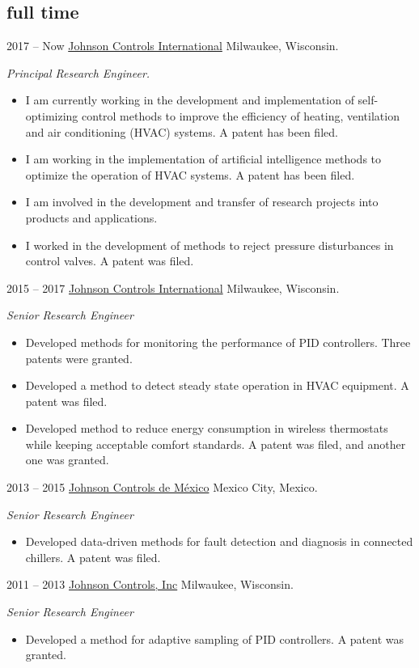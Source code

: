 \documentclass[]{../friggeri-cv} %
\begin{document}
\subsection{full time}

\begin{entrylist}


\entry
{2017 -- Now}
{\href{http://www.johnsoncontrols.com}{Johnson Controls International}}
{Milwaukee, Wisconsin.}
{
\emph{Principal Research Engineer.}
\begin{itemize}
	\item I am currently working in the development and implementation of self-optimizing control methods to improve the efficiency of heating, ventilation and air conditioning (HVAC) systems. A patent has been filed.
	\item I am working in the implementation of artificial intelligence methods to optimize the operation of HVAC systems. A patent has been filed.
	\item I am involved in the development and transfer of research projects into products and applications.
   \item I worked in the development of methods to reject pressure disturbances in control valves. A patent was filed.
   
\end{itemize}
}
\entry
{2015 -- 2017}
{\href{http://www.johnsoncontrols.com}{Johnson Controls International}}
{Milwaukee, Wisconsin.}
{
\emph{Senior Research Engineer}
\begin{itemize}
\item Developed methods for monitoring the performance of PID controllers. Three patents were granted.
\item Developed a method to detect steady state operation in HVAC equipment. A patent was filed.
\item Developed method to reduce energy consumption in wireless thermostats while keeping acceptable comfort standards. A patent was filed, and another one was granted.
\end{itemize}
}

\entry
{2013 -- 2015}
{\href{http://www.johnsoncontrols.com/es_mx}{Johnson Controls de México}}
{Mexico City, Mexico.}
{
\emph{Senior Research Engineer}
\begin{itemize}
\item Developed data-driven methods for fault detection and diagnosis in connected chillers. A patent was filed.
\end{itemize}
}

\entry
{2011 -- 2013}
{\href{http://www.johnsoncontrols.com}{Johnson Controls, Inc}}
{Milwaukee, Wisconsin.}
{
\emph{Senior Research Engineer}
\begin{itemize}
\item Developed a method for adaptive sampling of PID controllers. A patent was granted.
\end{itemize}
}

\end{entrylist}
\end{document}
